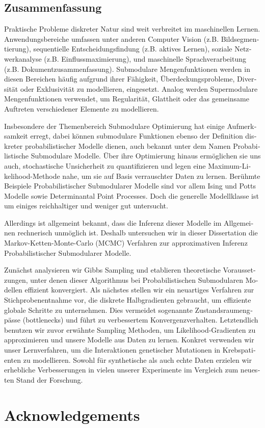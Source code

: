 \cleardoublepage
\begin{otherlanguage}{german}
\section*{\centering Zusammenfassung}
\vspace{1em}
Praktische Probleme diskreter Natur sind weit verbreitet im maschinellen Lernen.
Anwendungsbereiche umfassen unter anderen Computer Vision (z.B. Bildsegmentierung), sequentielle Entscheidungsfindung (z.B. aktives Lernen), soziale Netzwerkanalyse (z.B. Einflussmaximierung), und maschinelle Sprachverarbeitung (z.B. Dokumentzusammenfassung).
Submodulare Mengenfunktionen werden in diesen Bereichen häufig aufgrund ihrer Fähigkeit, Überdeckungsprobleme, Diversität oder Exklusivität zu modellieren, eingesetzt.
Analog werden Supermodulare Mengenfunktionen verwendet, um Regularität, Glattheit oder das gemeinsame Auftreten verschiedener Elemente zu modellieren.

Insbesondere der Themenbereich Submodulare Optimierung hat einige Aufmerksamkeit erregt, dabei können submodulare Funktionen ebenso der Definition diskreter probabilistischer Modelle dienen, auch bekannt unter dem Namen Probabilistische Submodulare Modelle.
Über ihre Optimierung hinaus ermöglichen sie uns auch, stochastische Unsicherheit zu quantifizieren und legen eine Maximum-Likelihood-Methode nahe, um sie auf Basis verrauschter Daten zu lernen.
Berühmte Beispiele Probabilistischer Submodularer Modelle sind vor allem Ising und Potts Modelle sowie Determinantal Point Processes.
Doch die generelle Modellklasse ist um einiges reichhaltiger und weniger gut untersucht. 

Allerdings ist allgemeint bekannt, dass die Inferenz dieser Modelle im Allgemeinen rechnerisch unmöglich ist.
Deshalb untersuchen wir in dieser Dissertation die Markov-Ketten-Monte-Carlo (MCMC) Verfahren zur approximativen Inferenz Probabilistischer Submodularer Modelle.

Zunächst analysieren wir Gibbs Sampling und etablieren theoretische Voraussetzungen, unter denen dieser Algorithmus bei Probabilistischen Submodularen Modellen effizient konvergiert.
Als nächstes stellen wir ein neuartiges Verfahren zur Stichprobenentnahme vor, die diskrete Halbgradienten gebraucht, um effiziente globale Schritte zu unternehmen.
Dies vermeidet sogenannte Zustandsraumengpässe (bottlenecks) und führt zu verbessertem Konvergenzverhalten.
Letztendlich benutzen wir zuvor erwähnte Sampling Methoden, um Likelihood-Gradienten zu approximieren und unsere Modelle aus Daten zu lernen.
Konkret verwenden wir unser Lernverfahren, um die Interaktionen genetischer Mutationen in Krebspatienten zu modellieren.
Sowohl für synthetische als auch echte Daten erzielen wir erhebliche Verbesserungen in vielen unserer Experimente im Vergleich zum neuesten Stand der Forschung.
\end{otherlanguage}

\cleardoublepage
\section*{\centering Acknowledgements}
\vspace{1em}